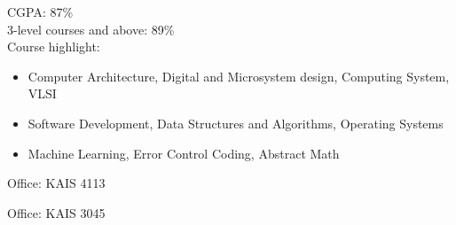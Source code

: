 \documentclass[10pt,a4paper,ragged2e,withhyper]{altacv}
\begin{document}
\begin{paracol}{2}










CGPA: 87\% \\
3-level courses and above: 89\% \\
Course highlight: \begin{itemize}
    \item Computer Architecture, Digital and Microsystem design, Computing System, VLSI
    \item Software Development, Data Structures and Algorithms, Operating Systems
    \item Machine Learning, Error Control Coding, Abstract Math
\end{itemize}


{Office: KAIS 4113}

\divider

{Office: KAIS 3045}


\end{paracol}
\end{document}

